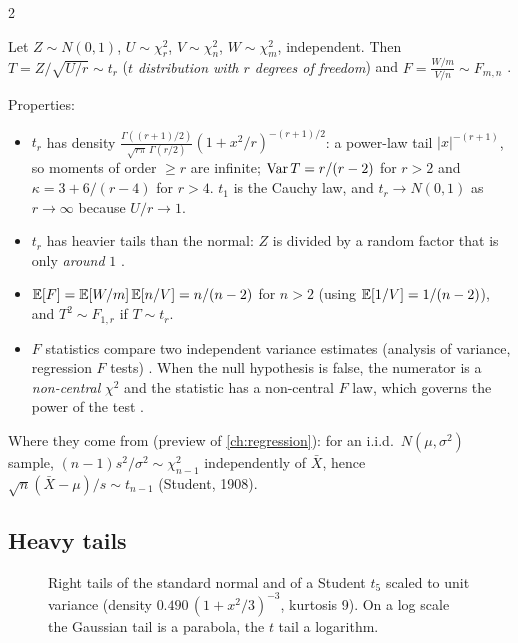 \begin{paracol}{2}
\begin{definition}
Let $Z\sim N(0,1)$, $U\sim\chi^2_r$, $V\sim\chi^2_n$, $W\sim\chi^2_m$, independent. Then
$T=Z/\sqrt{U/r}\sim t_r$ (\emph{$t$ distribution with $r$ degrees of freedom})  and
$F=\frac{W/m}{V/n}\sim F_{m,n}$ .
\end{definition}
Properties:
\begin{itemize}
  \item $t_r$ has density $\frac{\Gamma((r+1)/2)}{\sqrt{r\pi}\,\Gamma(r/2)}(1+x^2/r)^{-(r+1)/2}$: a power-law tail $|x|^{-(r+1)}$, so moments of
        order $\ge r$ are infinite; $\operatorname{Var} T=r/(r-2)$ for $r>2$ and $\kappa=3+6/(r-4)$ for $r>4$. $t_1$ is the Cauchy law,
        and $t_r\to N(0,1)$ as $r\to\infty$ because $U/r\to1$.
  \item $t_r$ has heavier tails than the normal: $Z$ is divided by a random factor that is only \emph{around} $1$
        .
  \item $\mathbb{E}[F]=\mathbb{E}[W/m]\,\mathbb{E}[n/V]=n/(n-2)$ for $n>2$ (using $\mathbb{E}[1/V]=1/(n-2)$), and $T^2\sim F_{1,r}$ if $T\sim t_r$.
  \item $F$ statistics compare two independent variance estimates (analysis of variance, regression $F$ tests)
        . When the null hypothesis is false, the numerator is a \emph{non-central} $\chi^2$ and the
        statistic has a non-central $F$ law, which governs the power of the test .
\end{itemize}
Where they come from (preview of \cref{ch:regression}): for an i.i.d.\ $N(\mu,\sigma^2)$ sample, $(n-1)s^2/\sigma^2\sim\chi^2_{n-1}$
independently of $\bar X$, hence $\sqrt n(\bar X-\mu)/s\sim t_{n-1}$ (Student, 1908).

\subsection{Heavy tails}\label{ch03:sec-heavy}

\begin{figure}[ht]
\centering
{}
\caption{Right tails of the standard normal and of a Student $t_5$ scaled to unit variance (density
$0.490\,(1+x^2/3)^{-3}$, kurtosis 9). On a log scale the Gaussian tail is a parabola, the $t$ tail a
logarithm.}\label{ch03:fig-tails}
\end{figure}


\end{paracol}
